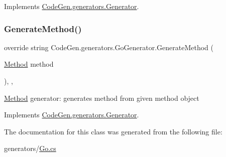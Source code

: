 Implements \mbox{\hyperlink{classCodeGen_1_1generators_1_1Generator_a0d1a48aedbca08c05af734a43739d1c3}{Code\+Gen.\+generators.\+Generator}}.

\mbox{\label{classCodeGen_1_1generators_1_1GoGenerator_ac732350d06454ed93f2053c0971c8fd9}} 
\subsubsection{\texorpdfstring{Generate\+Method()}{GenerateMethod()}}
{\footnotesize\ttfamily override string Code\+Gen.\+generators.\+Go\+Generator.\+Generate\+Method (\begin{DoxyParamCaption}\item[{\mbox{\hyperlink{classCodeGen_1_1generators_1_1Method}{Method}}}]{method }\end{DoxyParamCaption})\hspace{0.3cm}{\ttfamily [inline]}, {\ttfamily [protected]}, {\ttfamily [virtual]}}



\mbox{\hyperlink{classCodeGen_1_1generators_1_1Method}{Method}} generator\+: generates method from given method object  



Implements \mbox{\hyperlink{classCodeGen_1_1generators_1_1Generator_a04fc9bd217b3b8c3d5f7b1a3f92c79d3}{Code\+Gen.\+generators.\+Generator}}.



The documentation for this class was generated from the following file\+:\begin{DoxyCompactItemize}
\item 
generators/\mbox{\hyperlink{Go_8cs}{Go.\+cs}}\end{DoxyCompactItemize}
